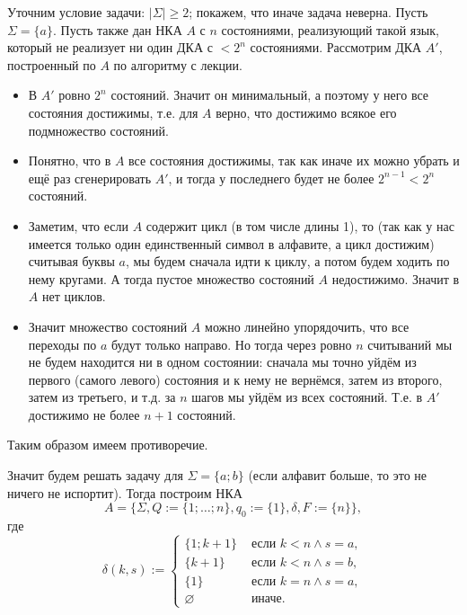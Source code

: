 \documentclass[12pt,a4paper]{article}
\begin{document}
    \begin{problem}{3}
        Уточним условие задачи: $|\Sigma| \geqslant 2$; покажем, что иначе задача неверна. Пусть $\Sigma = \{a\}$. Пусть также дан НКА $A$ с $n$ состояниями, реализующий такой язык, который не реализует ни один ДКА с $<2^n$ состояниями. Рассмотрим ДКА $A'$, построенный по $A$ по алгоритму с лекции.
        \begin{itemize}
            \item В $A'$ ровно $2^n$ состояний. Значит он минимальный, а поэтому у него все состояния достижимы, т.е. для $A$ верно, что достижимо всякое его подмножество состояний.
            \item Понятно, что в $A$ все состояния достижимы, так как иначе их можно убрать и ещё раз сгенерировать $A'$, и тогда у последнего будет не более $2^{n-1} < 2^n$ состояний.
            \item Заметим, что если $A$ содержит цикл (в том числе длины 1), то (так как у нас имеется только один единственный символ в алфавите, а цикл достижим) считывая буквы $a$, мы будем сначала идти к циклу, а потом будем ходить по нему кругами. А тогда пустое множество состояний $A$ недостижимо. Значит в $A$ нет циклов.
            \item Значит множество состояний $A$ можно линейно упорядочить, что все переходы по $a$ будут только направо. Но тогда через ровно $n$ считываний мы не будем находится ни в одном состоянии: сначала мы точно уйдём из первого (самого левого) состояния и к нему не вернёмся, затем из второго, затем из третьего, и т.д. за $n$ шагов мы уйдём из всех состояний. Т.е. в $A'$ достижимо не более $n+1$ состояний.
        \end{itemize}
        Таким образом имеем противоречие.

        Значит будем решать задачу для $\Sigma = \{a; b\}$ (если алфавит больше, то это не ничего не испортит). Тогда построим НКА
        \[A = \{\Sigma, Q := \{1; \dots; n\}, q_0 := \{1\}, \delta, F := \{n\}\},\]
        где
        \[
            \delta(k, s) :=
            \begin{cases}
                \{1; k+1\}& \text{ если } k < n \wedge s = a,\\
                \{k+1\}& \text{ если } k < n \wedge s = b,\\
                \{1\}& \text{ если } k = n \wedge s = a,\\
                \varnothing& \text{ иначе.}
            \end{cases}
        \]


\end{problem}
\end{document}
